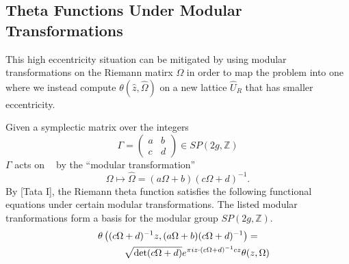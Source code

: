 \documentclass[12]{article}
\DeclareMathOperator{\hg}{\mathfrak{h}_g}
\begin{document}
\subsection{Theta Functions Under Modular Transformations}

This high eccentricity situation can be mitigated by using modular
transformations on the Riemann matirx $\Omega$ in order to map the problem into
one where we instead compute $\theta(\hat{z}, \hat{\Omega})$ on a new lattice
$\hat{U}_R$ that has smaller eccentricity.

Given a symplectic matrix over the integers
\[
\Gamma = \left( \begin{matrix} a & b \\ c & d \end{matrix} \right)
\in SP(2g,\mathbb{Z})
\]
$\Gamma$ acts on $\hg$ by the ``modular transformation''
\[
\Omega \mapsto \hat{\Omega} = (a\Omega + b) (c\Omega + d)^{-1}.
\]
By [Tata I], the Riemann theta function satisfies the following functional
equations under certain modular transformations. The listed modular
tranformations form a basis for the modular group $SP(2g, \mathbb{Z})$.
\begin{gather} \label{eqn: full transformation}
\theta \left( 
(c \Omega + d)^{-1} z, (a \Omega + b)(c \Omega + d)^{-1}
\right) = \notag \\
\qquad \qquad
\sqrt{\det(c \Omega + d)}
e^{\pi i z \cdot (c \Omega + d)^{-1} c z}
\theta(z, \Omega)
\end{gather}
\end{document}
